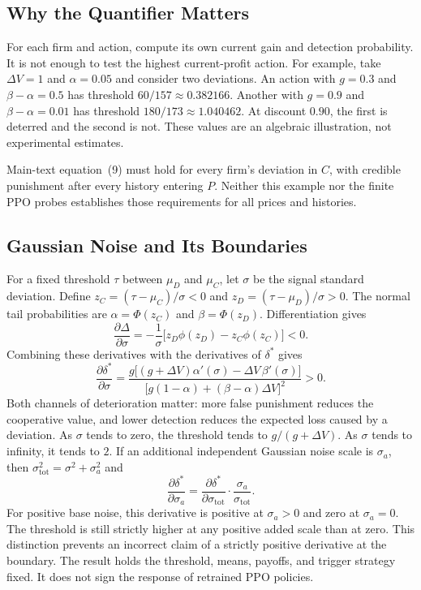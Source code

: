 \documentclass{article}
\begin{document}
\subsection{Why the Quantifier Matters}

For each firm and action, compute its own current gain and detection probability. It is not enough to test the highest current-profit action. For example, take $\Delta V = 1$ and $\alpha = 0.05$ and consider two deviations. An action with $g = 0.3$ and $\beta - \alpha = 0.5$ has threshold $60/157 \approx 0.382166$. Another with $g = 0.9$ and $\beta - \alpha = 0.01$ has threshold $180/173 \approx 1.040462$. At discount $0.90$, the first is deterred and the second is not. These values are an algebraic illustration, not experimental estimates.

Main-text equation~(9) must hold for every firm's deviation in $C$, with credible punishment after every history entering $P$. Neither this example nor the finite PPO probes establishes those requirements for all prices and histories.

\subsection{Gaussian Noise and Its Boundaries}

For a fixed threshold $\tau$ between $\mu_D$ and $\mu_C$, let $\sigma$ be the signal standard deviation. Define $z_C = (\tau - \mu_C)/\sigma < 0$ and $z_D = (\tau - \mu_D)/\sigma > 0$. The normal tail probabilities are $\alpha = \Phi(z_C)$ and $\beta = \Phi(z_D)$. Differentiation gives
\[
\frac{\partial \Delta}{\partial \sigma} = -\frac{1}{\sigma}\bigl[z_D \phi(z_D) - z_C \phi(z_C)\bigr] < 0.
\]
Combining these derivatives with the derivatives of $\delta^*$ gives
\[
\frac{\partial \delta^*}{\partial \sigma} = \frac{g\bigl[(g + \Delta V)\alpha'(\sigma) - \Delta V\,\beta'(\sigma)\bigr]}{\bigl[g(1-\alpha) + (\beta-\alpha)\Delta V\bigr]^2} > 0.
\]
Both channels of deterioration matter: more false punishment reduces the cooperative value, and lower detection reduces the expected loss caused by a deviation. As $\sigma$ tends to zero, the threshold tends to $g/(g + \Delta V)$. As $\sigma$ tends to infinity, it tends to $2$. If an additional independent Gaussian noise scale is $\sigma_a$, then $\sigma_{\mathrm{tot}}^2 = \sigma^2 + \sigma_a^2$ and
\[
\frac{\partial \delta^*}{\partial \sigma_a} = \frac{\partial \delta^*}{\partial \sigma_{\mathrm{tot}}} \cdot \frac{\sigma_a}{\sigma_{\mathrm{tot}}}.
\]
For positive base noise, this derivative is positive at $\sigma_a > 0$ and zero at $\sigma_a = 0$. The threshold is still strictly higher at any positive added scale than at zero. This distinction prevents an incorrect claim of a strictly positive derivative at the boundary. The result holds the threshold, means, payoffs, and trigger strategy fixed. It does not sign the response of retrained PPO policies.
\end{document}
